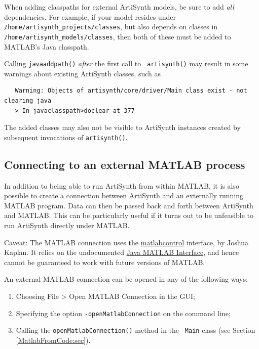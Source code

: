 \documentclass{article}
\begin{document}
\begin{sideblock}
When adding classpaths for external ArtiSynth models, be sure to add
{\it all} dependencies. For example, if your model resides under {\tt
/home/artisynth\_projects/classes}, but also depends on classes in {\tt
/home/artisynth\_models/classes}, then both of these must be added to
MATLAB's Java classpath.
\end{sideblock}

\begin{sideblock}
Calling {\tt javaaddpath()}
{\it after} the first call to {\tt
artisynth()} may result in some warnings about existing
ArtiSynth classes, such as
\begin{verbatim}
   Warning: Objects of artisynth/core/driver/Main class exist - not clearing java 
   > In javaclasspath>doclear at 377
\end{verbatim}
The added classes may also not be visible to ArtiSynth instances
created by subsequent invocations of {\tt artisynth()}.
\end{sideblock}

\subsection{Connecting to an external MATLAB process}

In addition to being able to run ArtiSynth from within MATLAB, it is
also possible to create a connection between ArtiSynth and an
externally running MATLAB program. Data can then be passed back and
forth between ArtiSynth and MATLAB. This can be particularly useful if
it turns out to be unfeasible to run ArtiSynth directly under MATLAB.

\begin{sideblock}
Caveat: The MATLAB connection uses the
\href{https://code.google.com/p/matlabcontrol}{matlabcontrol}
interface, by Joshua Kaplan. It relies on the undocumented
\href{https://code.google.com/p/wiki/JMI}{Java MATLAB Interface}, and
hence cannot be guaranteed to work with future versions of MATLAB.
\end{sideblock}

An external MATLAB connection can be opened in any of the following
ways:

\begin{enumerate}

\item Choosing {\sf File > Open MATLAB Connection} in the GUI;

\item Specifying the option {\tt -openMatlabConnection} on
the command line;

\item Calling the {\tt openMatlabConnection()} method in the {\tt
Main} class (see Section \ref{MatlabFromCode:sec}).

\end{enumerate}
\end{document}
